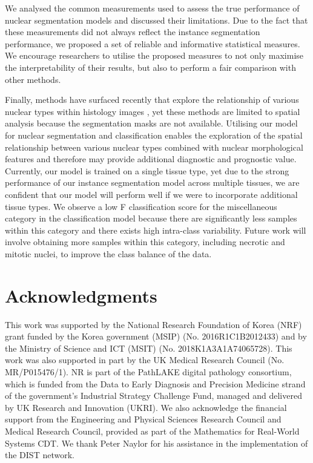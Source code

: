 \documentclass[journal]{IEEEtran}
\begin{document}
	We analysed the common measurements used to assess the true performance of nuclear segmentation models and discussed their limitations. Due to the fact that these measurements did not always reflect the instance segmentation performance, we proposed a set of reliable and informative statistical measures. We encourage researchers to utilise the proposed measures to not only maximise the interpretability of their results, but also to perform a fair comparison with other methods.
	
	Finally, methods have surfaced recently that explore the relationship of various nuclear types within histology images \cite{javed2018cellular, sirinukunwattana2018novel}, yet these methods are limited to spatial analysis because the segmentation masks are not available. Utilising our model for nuclear segmentation and classification enables the exploration of the spatial relationship between various nuclear types combined with nuclear morphological features and therefore may provide additional diagnostic and prognostic value. Currently, our model is trained on a single tissue type, yet due to the strong performance of our instance segmentation model across multiple tissues, we are confident that our model will perform well if we were to incorporate additional tissue types. We observe a low F classification score for the miscellaneous category in the classification model because there are significantly less samples within this category and there exists high intra-class variability. Future work will involve obtaining more samples within this category, including necrotic and mitotic nuclei, to improve the class balance of the data. 
	 
	 	 
\section*{Acknowledgments}
	
	\setcounter{table}{0}
    \renewcommand{\thetable}{A\arabic{table}}
	
	This work was supported by the National Research Foundation of Korea (NRF) grant funded by the Korea government (MSIP) (No. 2016R1C1B2012433) and by the Ministry of Science and ICT (MSIT) (No. 2018K1A3A1A74065728). This work was also supported in part by the UK Medical Research Council (No. MR/P015476/1). NR is part of the PathLAKE digital pathology consortium, which is funded from the Data to Early Diagnosis and Precision Medicine strand of the government’s Industrial Strategy Challenge Fund, managed and delivered by UK Research and Innovation (UKRI). We also acknowledge the financial support from the Engineering and Physical Sciences Research Council and Medical Research Council, provided as part of the Mathematics for Real-World Systems CDT. We thank Peter Naylor for his assistance in the implementation of the DIST network.
	
\end{document}
